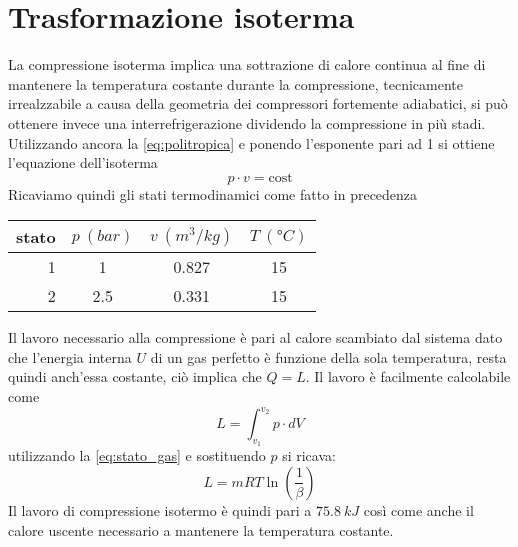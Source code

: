 \documentclass[a4paper,12pt]{article}
\begin{document}
\section{Trasformazione isoterma}
\label{sec:quarta_trasformazione}
La compressione isoterma implica una sottrazione di calore continua al fine di mantenere la temperatura
costante durante la compressione, tecnicamente irrealzzabile a causa della geometria dei compressori
fortemente adiabatici, si può ottenere invece una interrefrigerazione dividendo la compressione in più 
stadi.
Utilizzando ancora la \eqref{eq:politropica} e ponendo l'esponente pari ad 1 si ottiene l'equazione dell'isoterma
\begin{equation}
    p\cdot v = \text{cost}
\end{equation}
Ricaviamo quindi gli stati termodinamici come fatto in precedenza
\begin{center}
    \begin{tabular}{r|c|c|c}
        stato    & $p\ (bar)$ & $v\ (m^3/kg)$ & $T\ (\text{°}C) $\\ \hline
        1   &           1 &          0.827    &           15     \\ \hline
        2   &         2.5 &          0.331    &           15
    \end{tabular}
\end{center}
Il lavoro necessario alla compressione è pari al calore scambiato dal sistema dato che l'energia interna $U$
di un gas perfetto è funzione della sola temperatura, resta quindi anch'essa costante, ciò implica che
$Q = L$.
Il lavoro è facilmente calcolabile come 
\begin{equation}
    L = \int_{v_1}^{v_2} p\cdot dV
\end{equation}
utilizzando la \eqref{eq:stato_gas} e sostituendo $p$ si ricava:
\begin{equation}
    L = mRT \ln\left(\frac{1}{\beta}\right)
\end{equation}
Il lavoro di compressione isotermo è quindi pari a $75.8\ kJ$ così come anche il calore uscente necessario a 
mantenere la temperatura costante.
\end{document}
